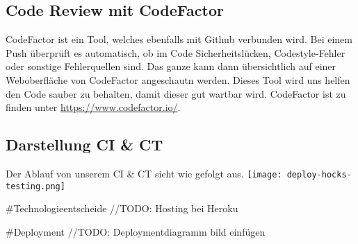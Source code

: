 	\subsection{Code Review mit CodeFactor}
	CodeFactor ist ein Tool, welches ebenfalls mit Github verbunden wird. Bei einem Push überprüft es automatisch, ob im Code Sicherheitslücken, Codestyle-Fehler oder sonstige Fehlerquellen sind. Das ganze kann dann übersichtlich auf einer Weboberfläche von CodeFactor angeschautn werden. Dieses Tool wird uns helfen den Code sauber zu behalten, damit dieser gut wartbar wird. CodeFactor ist zu finden unter \href{https://www.codefactor.io/}{https://www.codefactor.io/}.

	\subsection{Darstellung CI \& CT}
	Der Ablauf von unserem CI \& CT sieht wie gefolgt aus.\newline
	\noindent
	\texttt{[image: deploy-hocks-testing.png]}

#Technologieentscheide
	//TODO: Hosting bei Heroku

#Deployment
	//TODO: Deploymentdiagramm bild einfügen

